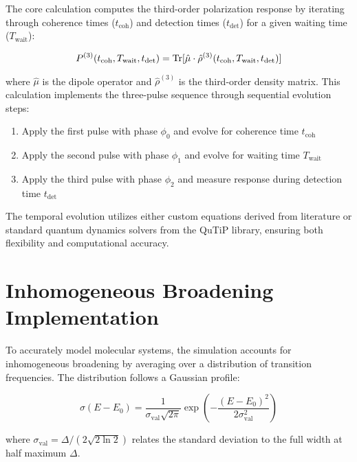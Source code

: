 \noindent
The core calculation computes the third-order polarization response by iterating through coherence times ($t_{\text{coh}}$) and detection times ($t_{\text{det}}$) for a given waiting time ($T_{\text{wait}}$):

\begin{equation}
	\label{eq:polarization_third_order}
	P^{(3)}(t_{\text{coh}}, T_{\text{wait}}, t_{\text{det}}) = \mathrm{Tr}[\hat{\mu} \cdot \hat{\rho}^{(3)}(t_{\text{coh}}, T_{\text{wait}}, t_{\text{det}})]
\end{equation}

\noindent
where $\hat{\mu}$ is the dipole operator and $\hat{\rho}^{(3)}$ is the third-order density matrix. This calculation implements the three-pulse sequence through sequential evolution steps:

\begin{enumerate}
	\item Apply the first pulse with phase $\phi_0$ and evolve for coherence time $t_{\text{coh}}$
	\item Apply the second pulse with phase $\phi_1$ and evolve for waiting time $T_{\text{wait}}$
	\item Apply the third pulse with phase $\phi_2$ and measure response during detection time $t_{\text{det}}$
\end{enumerate}

\noindent
The temporal evolution utilizes either custom equations derived from literature or standard quantum dynamics solvers from the QuTiP \cite{lambertetal2024qutip5quantum} library, ensuring both flexibility and computational accuracy.

\section{Inhomogeneous Broadening Implementation}
\label{sec:inhomogeneous_broadening}

\noindent
To accurately model molecular systems, the simulation accounts for inhomogeneous broadening by averaging over a distribution of transition frequencies. The distribution follows a Gaussian profile:

\begin{equation}
	\label{eq:gaussian_distribution}
	\sigma(E - E_0) = \frac{1}{\sigma_{\text{val}}\sqrt{2\pi}} \exp\left(-\frac{(E-E_0)^2}{2\sigma_{\text{val}}^2}\right)
\end{equation}

\noindent
where $\sigma_{\text{val}} = \Delta/(2\sqrt{2\ln{2}})$ relates the standard deviation to the full width at half maximum $\Delta$.

